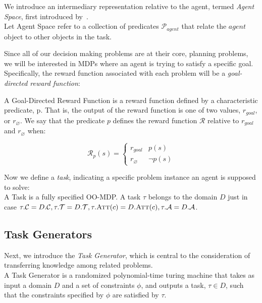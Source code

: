 \documentclass[11pt]{article}
\begin{document}
We introduce an intermediary representation relative to the agent, termed {\it Agent Space}, first introduced by~\cite{konidaris2006framework}.\\

{ Let \textup{Agent Space} refer to a collection of predicates $\mathcal{P}_{agent}$ that relate the $agent$ object to other objects in the task}.

Since all of our decision making problems are at their core, planning problems, we will be interested in MDPs where an agent is trying to satisfy a specific goal. Specifically, the reward function associated with each problem will be a {\it goal-directed reward function}: \\

{ A \textup{Goal-Directed Reward Function} is a reward function defined by a characteristic predicate, p. That is, the output of the reward function is one of two values, $r_{goal}$, or $r_\varnothing$. We say that the predicate $p$ defines the reward function $\mathcal{R}$ relative to $r_{goal}$ and $r_\varnothing$ when:

\begin{equation}
\mathcal{R}_p(s) = \begin{cases}
r_{goal}& p(s) \\
r_\varnothing&\neg p(s)
\end{cases}
\end{equation}}

Now we define a {\it task}, indicating a specific problem instance an agent is supposed to solve: \\

{ A \textup{Task} is a fully specified OO-MDP. A task $\tau$ belongs to the domain $D$ just in case $\tau.\mathcal{C} = D.\mathcal{C}, \tau.\mathcal{T} = D.\mathcal{T}, \tau.\textsc{Att}(c) = D.\textsc{Att}(c), \tau.\mathcal{A} = D.\mathcal{A}$}.


\subsection{Task Generators}
Next, we introduce the {\it Task Generator}, which is central to the consideration of transferring knowledge among related problems. \\

{ A \textup{Task Generator} is a randomized polynomial-time turing machine that takes as input a domain $D$ and a set of constraints $\phi$, and outputs a task, $\tau \in D$, such that the constraints specified by $\phi$ are satisfied by $\tau$.}
\end{document}
